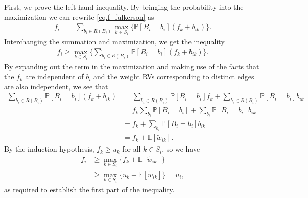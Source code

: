 \documentclass[12pt]{article}
\def\P{\mathbb{P}}
\def\E{\mathbb{E}}
\begin{document}
First, we prove the left-hand inequality. By bringing the probability into the maximization we can rewrite \eqref{eq.f_fulkerson} as    
\begin{align*}
f_i &= \sum_{b_i \in R(B_i)} \max_{k \in S_i} \{ \P[B_i = b_i] (f_k + b_{ik} ) \}.
\end{align*}
Interchanging the summation and maximization, we get the inequality
\begin{align*}
f_i \geq \max_{k \in S_i} \bigg\{ \sum_{b_i \in R(B_i)} \P[B_i = b_i] (f_k + b_{ik} ) \bigg\}.
\end{align*}
By expanding out the term in the maximization and making use of the facts that the $f_k$ are independent of $b_i$ and the weight RVs corresponding to distinct edges are also independent, we see that
\begin{align*}
\sum_{b_i \in R(B_i)} \P[B_i = b_i] (f_k + b_{ik} ) &=  \sum_{b_i \in R(B_i)} \P[B_i = b_i]f_k + \sum_{b_i \in R(B_i)} \P[B_i = b_i] b_{ik} \\
&= f_k \sum_{b_i} \P[B_i = b_i] + \sum_{b_i} \P[B_i = b_i] b_{ik} \\
&= f_k + \sum_{b_i} \P[B_i = b_i] b_{ik} \\
&= f_k + \E[\tilde{w}_{ik}].
\end{align*}
By the induction hypothesis, $f_k \geq u_k$ for all $k \in S_i$, so we have
\begin{align*}
f_i &\geq \max_{k \in S_i} \{ f_k + \E[\tilde{w}_{ik}] \} \\
&\geq \max_{k \in S_i} \{ u_k + \E[\tilde{w}_{ik}] \} = u_i,
\end{align*}
as required to establish the first part of the inequality. 
\end{document}
